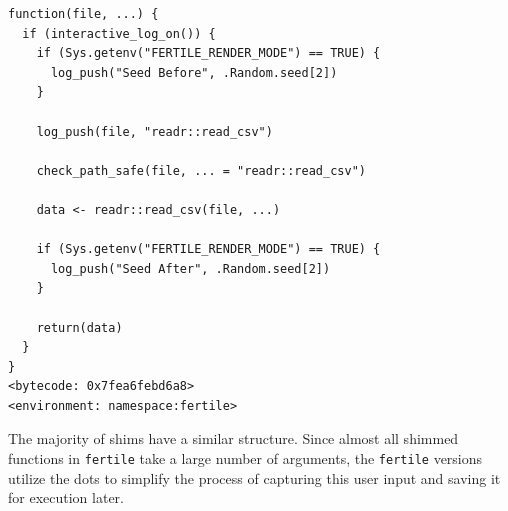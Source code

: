 \documentclass[12pt,twoside]{reedthesis}
\begin{document}
\begin{verbatim}
function(file, ...) {
  if (interactive_log_on()) {
    if (Sys.getenv("FERTILE_RENDER_MODE") == TRUE) {
      log_push("Seed Before", .Random.seed[2])
    }

    log_push(file, "readr::read_csv")

    check_path_safe(file, ... = "readr::read_csv")

    data <- readr::read_csv(file, ...)

    if (Sys.getenv("FERTILE_RENDER_MODE") == TRUE) {
      log_push("Seed After", .Random.seed[2])
    }

    return(data)
  }
}
<bytecode: 0x7fea6febd6a8>
<environment: namespace:fertile>
\end{verbatim}
The majority of shims have a similar structure. Since almost all shimmed functions in \texttt{fertile} take a large number of arguments, the \texttt{fertile} versions utilize the dots to simplify the process of capturing this user input and saving it for execution later.
\end{document}
